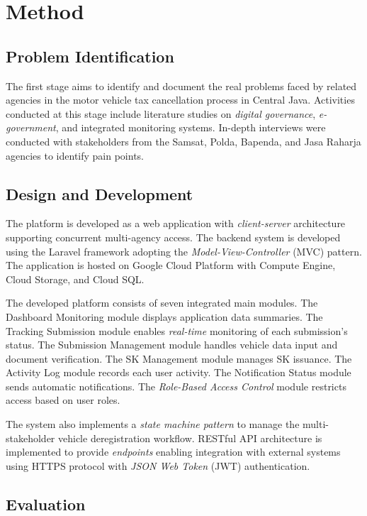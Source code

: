 \documentclass[conference,a4paper]{IEEEtran}
\begin{document}
\section{Method}
\label{sec:method}

\subsection{Problem Identification}
\label{subsec:problem-identification}

The first stage aims to identify and document the real problems faced by related agencies in the motor vehicle tax cancellation process in Central Java. Activities conducted at this stage include literature studies on \emph{digital governance}, \emph{e-government}, and integrated monitoring systems. In-depth interviews were conducted with stakeholders from the Samsat, Polda, Bapenda, and Jasa Raharja agencies to identify pain points.

\subsection{Design and Development}
\label{subsec:design-development}

The platform is developed as a web application with \emph{client-server} architecture supporting concurrent multi-agency access. The backend system is developed using the Laravel framework adopting the \emph{Model-View-Controller} (MVC) pattern. The application is hosted on Google Cloud Platform with Compute Engine, Cloud Storage, and Cloud SQL.

The developed platform consists of seven integrated main modules. The Dashboard Monitoring module displays application data summaries. The Tracking Submission module enables \emph{real-time} monitoring of each submission's status. The Submission Management module handles vehicle data input and document verification. The SK Management module manages SK issuance. The Activity Log module records each user activity. The Notification Status module sends automatic notifications. The \emph{Role-Based Access Control} module restricts access based on user roles.

The system also implements a \emph{state machine pattern} to manage the multi-stakeholder vehicle deregistration workflow. RESTful API architecture is implemented to provide \emph{endpoints} enabling integration with external systems using HTTPS protocol with \emph{JSON Web Token} (JWT) authentication.

\subsection{Evaluation}
\label{subsec:evaluation}
\end{document}
